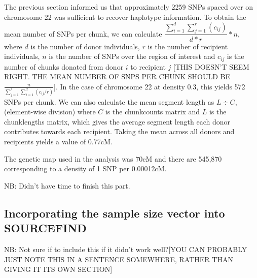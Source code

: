 The previous section informed us that approximately 2259 SNPs spaced over on chromosome 22 was sufficient to recover haplotype information. To obtain the mean number of SNPs per chunk, we can calculate $\dfrac{\sum_{i=1}^{d} \sum_{j=1}^{r} (c_{ij})}{d*r} * n$, where $d$ is the number of donor individuals, $r$ is the number of recipient individuals, $n$ is the number of SNPs over the region of interest and $c_{ij}$ is the number of chunks donated from donor $i$ to recipient $j$ {\color{red}[THIS DOESN'T SEEM RIGHT. THE MEAN NUMBER OF SNPS PER CHUNK SHOULD BE $\frac{n}{\sum_{j=1}^{r} \sum_{i=1}^{d} (c_{ij}/r)}$]}. In the case of chromosome 22 at density 0.3, this yields 572 SNPs per chunk. We can also calculate the mean segment length as $L \div C$, (element-wise division) where $C$ is the chunkcounts matrix and $L$ is the  chunklengths matrix, which gives the average segment length each donor contributes towards each recipient. Taking the mean across all donors and recipients yields a value of 0.77cM. 

The genetic map used in the analysis was 70cM and there are 545,870 corresponding to a density of 1 SNP per 0.00012cM. 

NB: Didn't have time to finish this part. 


\subsection{Incorporating the sample size vector into SOURCEFIND}

NB: Not sure if to include this if it didn't work well?{\color{red}[YOU CAN PROBABLY JUST NOTE THIS IN A SENTENCE SOMEWHERE, RATHER THAN GIVING IT ITS OWN SECTION]}








